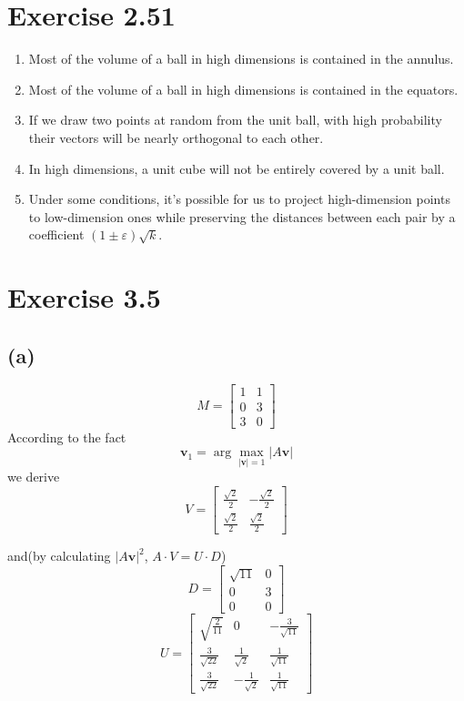 \documentclass[paper=a4, fontsize=11pt]{scrartcl} %
\numberwithin{equation}{section} %
\numberwithin{figure}{section} %
\numberwithin{table}{section} %
\begin{document}
\section*{Exercise 2.51}
\begin{enumerate}
	\item Most of the volume of a ball in high dimensions is contained in the annulus. 
	\item Most of the volume of a ball in high dimensions is contained in the equators.
	\item If we draw two points at random from the unit ball, with high probability their vectors will be nearly orthogonal to each other.
	\item In high dimensions, a unit cube will not be entirely covered by a unit ball. 
	\item Under some conditions, it's possible for us to project high-dimension points to low-dimension ones while preserving the distances between each pair by a coefficient $(1\pm \varepsilon)\sqrt{k}$.
\end{enumerate}
\section*{Exercise 3.5}
\subsection*{(a)}
$$ M = \begin{bmatrix}1 & 1 \\ 0 & 3 \\ 3 & 0\end{bmatrix}$$
According to the fact $$\mathbf{v}_1 = \arg\max_{|\mathbf{v}| = 1}|A\mathbf{v}|$$
we derive $$V = \begin{bmatrix}\frac{\sqrt{2}}{2} & -\frac{\sqrt{2}}{{2}} \\ \frac{\sqrt{2}}{2} & \frac{\sqrt{2}}{2} \end{bmatrix} $$

and(by calculating $|A\mathbf{v}|^2$, $A\cdot V = U\cdot D$) $$D = \begin{bmatrix}\sqrt{11} & 0 \\ 0 & 3 \\ 0 & 0 \end{bmatrix}$$
$$U = \begin{bmatrix} \sqrt{\frac{2}{11}} & 0 & -\frac{3}{\sqrt{11}}\\ \frac{3}{\sqrt{22}} & \frac{1}{\sqrt{2}} & \frac{1}{\sqrt{11}} \\ \frac{3}{\sqrt{22}} & -\frac{1}{\sqrt{2}} & \frac{1}{\sqrt{11}}\end{bmatrix} $$ 
\end{document}
